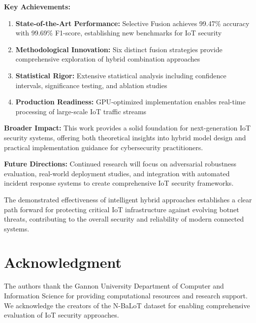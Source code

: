 \documentclass[conference]{IEEEtran}
\begin{document}
\textbf{Key Achievements:}
\begin{enumerate}
\item \textbf{State-of-the-Art Performance:} Selective Fusion achieves 99.47\% accuracy with 99.69\% F1-score, establishing new benchmarks for IoT security
\item \textbf{Methodological Innovation:} Six distinct fusion strategies provide comprehensive exploration of hybrid combination approaches
\item \textbf{Statistical Rigor:} Extensive statistical analysis including confidence intervals, significance testing, and ablation studies
\item \textbf{Production Readiness:} GPU-optimized implementation enables real-time processing of large-scale IoT traffic streams
\end{enumerate}

\textbf{Broader Impact:} This work provides a solid foundation for next-generation IoT security systems, offering both theoretical insights into hybrid model design and practical implementation guidance for cybersecurity practitioners.

\textbf{Future Directions:} Continued research will focus on adversarial robustness evaluation, real-world deployment studies, and integration with automated incident response systems to create comprehensive IoT security frameworks.

The demonstrated effectiveness of intelligent hybrid approaches establishes a clear path forward for protecting critical IoT infrastructure against evolving botnet threats, contributing to the overall security and reliability of modern connected systems.

\section*{Acknowledgment}
The authors thank the Gannon University Department of Computer and Information Science for providing computational resources and research support. We acknowledge the creators of the N-BaLoT dataset for enabling comprehensive evaluation of IoT security approaches.
\end{document}
